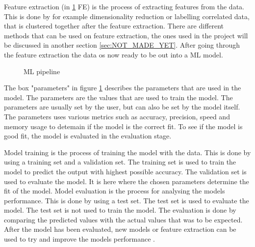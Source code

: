Feature extraction (in \ref{fig:ml_pipeline} FE) is the process of extracting features from the data. This is done by for example dimensionality reduction or labelling correlated data, that is clustered together after the feature extraction. There are different methods that can be used on feature extraction, the ones used in the project will be discussed in another section \ref{sec:NOT_MADE_YET}. After going through the feature extraction the data os now ready to be out into a ML  model.
\begin{figure}
\centering
{}
\caption{ML pipeline}
\label{fig:ml_pipeline}
\end{figure}

The box "parameters" in figure \ref{fig:ml_pipeline} describes the parameters that are used in the model. The parameters are the values that are used to train the model. The parameters are usually set by the user, but can also be set by the model itself. The parameters uses various metrics such as accuracy, precision, speed and memory usage to detemain if the model is the correct fit. To see if the model is good fit, the model is evaluated in the evaluation stage. 

Model training is the process of training the model with the data. This is done by using a training set and a validation set. The training set is used to train the model to predict the output with highest possible accuracy. The validation set is used to evaluate the model. It is here where the chosen parameters determine the fit of the model. 
Model evaluation is the process for analysing the models performance. This is done by using a test set. The test set is used to evaluate the model. The test set is not used to train the model. The evaluation is done by comparing the predicted values with the actual values that was to be expected. After the model has been evaluated, new models or feature extraction can be used to try and improve the models performance \cite{ml_pipeline}.


\begin{comment}   
@misc{ml_pipeline,
  organization = {javapoint},
  url          = {https://www.javatpoint.com/machine-learning-pipeline},
  title        = {Machine Learning Pipeline},
  urldate      = {2022-10-04}
}
\end{comment}